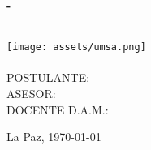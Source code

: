 \begin{titlepage}
    \centering
    {\bfseries \large \college - \collegefaculty \par \collegefield }\\[2cm]

    \texttt{[image: assets/umsa.png]}
    \\[1cm]

    {\LARGE \MakeUppercase{\documenttitle}}\\[1cm]

    \textbf{\Large \MakeUppercase{\projecttitle}}
    \vfill
    \MakeUppercase{Postulante: } \MakeUppercase{\student}\\[1cm]

    \MakeUppercase{Asesor: } \MakeUppercase{\tutor}\\[1cm]

    \MakeUppercase{Docente D.A.M.: } \MakeUppercase{\professor}\\[1cm]

    \vfill
    {La Paz, \today\par}
\end{titlepage}